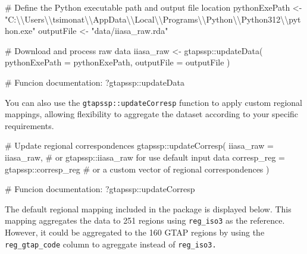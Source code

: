 \documentclass[
  letterpaper,
  DIV=11,
  numbers=noendperiod]{scrartcl}
\newenvironment{Shaded}{}{}
\newcommand{\AttributeTok}[1]{\textcolor[rgb]{0.00,0.34,0.68}{#1}}
\newcommand{\CommentTok}[1]{\textcolor[rgb]{0.54,0.53,0.53}{#1}}
\newcommand{\FunctionTok}[1]{\textcolor[rgb]{0.39,0.29,0.61}{#1}}
\newcommand{\NormalTok}[1]{\textcolor[rgb]{0.12,0.11,0.11}{#1}}
\newcommand{\OtherTok}[1]{\textcolor[rgb]{0.00,0.43,0.16}{#1}}
\newcommand{\SpecialCharTok}[1]{\textcolor[rgb]{0.24,0.68,0.91}{#1}}
\newcommand{\StringTok}[1]{\textcolor[rgb]{0.75,0.01,0.01}{#1}}
\begin{document}
\begin{Shaded}
\begin{Highlighting}[]
\CommentTok{\# Define the Python executable path and output file location}
\NormalTok{pythonExePath }\OtherTok{\textless{}{-}} \StringTok{"C:}\SpecialCharTok{\textbackslash{}\textbackslash{}}\StringTok{Users}\SpecialCharTok{\textbackslash{}\textbackslash{}}\StringTok{tsimonat}\SpecialCharTok{\textbackslash{}\textbackslash{}}\StringTok{AppData}\SpecialCharTok{\textbackslash{}\textbackslash{}}\StringTok{Local}\SpecialCharTok{\textbackslash{}\textbackslash{}}\StringTok{Programs}\SpecialCharTok{\textbackslash{}\textbackslash{}}\StringTok{Python}\SpecialCharTok{\textbackslash{}\textbackslash{}}\StringTok{Python312}\SpecialCharTok{\textbackslash{}\textbackslash{}}\StringTok{python.exe"}
\NormalTok{outputFile }\OtherTok{\textless{}{-}} \StringTok{"data/iiasa\_raw.rda"}

\CommentTok{\# Download and process raw data}
\NormalTok{iiasa\_raw }\OtherTok{\textless{}{-}}\NormalTok{ gtapssp}\SpecialCharTok{::}\FunctionTok{updateData}\NormalTok{(}
  \AttributeTok{pythonExePath =}\NormalTok{ pythonExePath,}
  \AttributeTok{outputFile =}\NormalTok{ outputFile}
\NormalTok{)}

\CommentTok{\# Funcion documentation:}
\NormalTok{?gtapssp}\SpecialCharTok{::}\NormalTok{updateData}
\end{Highlighting}
\end{Shaded}

You can also use the \texttt{gtapssp::updateCorresp} function to apply
custom regional mappings, allowing flexibility to aggregate the dataset
according to your specific requirements.

\begin{Shaded}
\begin{Highlighting}[]
\CommentTok{\# Update regional correspondences}
\NormalTok{gtapssp}\SpecialCharTok{::}\FunctionTok{updateCorresp}\NormalTok{(}
  \AttributeTok{iiasa\_raw =}\NormalTok{ iiasa\_raw, }\CommentTok{\# or gtapssp::iiasa\_raw for use default input data}
  \AttributeTok{corresp\_reg =}\NormalTok{ gtapssp}\SpecialCharTok{::}\NormalTok{corresp\_reg }\CommentTok{\# or a custom vector of regional correspondences}
\NormalTok{)}

\CommentTok{\# Funcion documentation:}
\NormalTok{?gtapssp}\SpecialCharTok{::}\NormalTok{updateCorresp}
\end{Highlighting}
\end{Shaded}

The default regional mapping included in the package is displayed below.
This mapping aggregates the data to 251 regions using \texttt{reg\_iso3}
as the reference. However, it could be aggregated to the 160 GTAP
regions by using the \texttt{reg\_gtap\_code} column to agreggate
instead of \texttt{reg\_iso3.}
\end{document}
